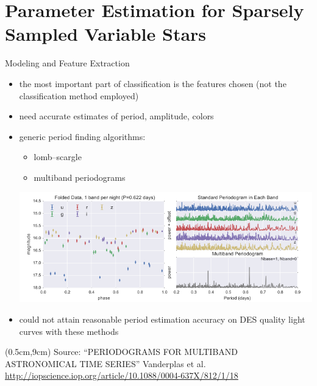 \documentclass[12pt]{beamer}
\newcommand{\att}[1]{\begin{textblock*}{12cm}(0.5cm,9cm) %
  {\tiny Source: #1}
      \end{textblock*}}
\begin{document}
\section{Parameter Estimation for Sparsely Sampled Variable Stars}


\begin{frame}{Modeling and Feature Extraction}

  \vspace{-.1in}
  
  \begin{itemize}
  \item the most important part of classification is the features chosen (not the classification method employed)
  \item need accurate estimates of period, amplitude, colors
  \item generic period finding algorithms:
    \begin{itemize}
    \item lomb--scargle
    \item multiband periodograms
    \end{itemize}
  \begin{center}
    \includegraphics[scale=0.35]{figs/vanderplas_periodogram.png}
  \end{center}
  \vspace{-.15in}
\item could not attain reasonable period estimation accuracy on DES quality light curves with these methods
  \end{itemize}
  
  \att{``PERIODOGRAMS FOR MULTIBAND ASTRONOMICAL TIME SERIES'' Vanderplas et al. \url{http://iopscience.iop.org/article/10.1088/0004-637X/812/1/18}\\}
\end{frame}
\end{document}

